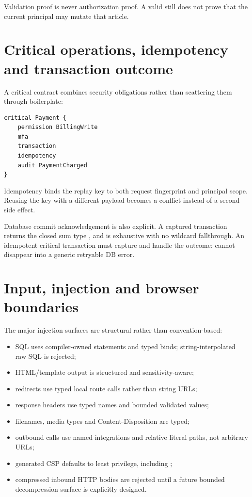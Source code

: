 Validation proof is never authorization proof. A valid  still does not prove that the current principal may mutate that article.

\section{Critical operations, idempotency and transaction outcome}

A critical contract combines security obligations rather than scattering them through boilerplate:

\begin{lstlisting}[language=RWLang]
critical Payment {
    permission BillingWrite
    mfa
    transaction
    idempotency
    audit PaymentCharged
}
\end{lstlisting}

Idempotency binds the replay key to both request fingerprint and principal scope. Reusing the key with a different payload becomes a conflict instead of a second side effect.

Database commit acknowledgement is also explicit. A captured transaction returns the closed sum type , and  is exhaustive with no wildcard fallthrough. An idempotent critical transaction must capture and handle the outcome;  cannot disappear into a generic retryable DB error.

\section{Input, injection and browser boundaries}

The major injection surfaces are structural rather than convention-based:

\begin{itemize}
  \item SQL uses compiler-owned statements and typed binds; string-interpolated raw SQL is rejected;
  \item HTML/template output is structured and sensitivity-aware;
  \item redirects use typed local route calls rather than string URLs;
  \item response headers use typed names and bounded validated values;
  \item filenames, media types and Content-Disposition are typed;
  \item outbound calls use named integrations and relative literal paths, not arbitrary URLs;
  \item generated CSP defaults to least privilege, including ;
  \item compressed inbound HTTP bodies are rejected until a future bounded decompression surface is explicitly designed.
\end{itemize}

